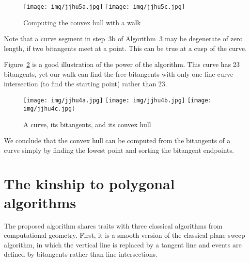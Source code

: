 \documentclass[11pt]{article}
\newif\ifTalk
\begin{document}
\begin{figure}[h]
\begin{center}
\texttt{[image: img/jjhu5a.jpg]} 
\texttt{[image: img/jjhu5c.jpg]}
\end{center}
\caption{Computing the convex hull with a walk}
\label{fig:algtrace}
\end{figure}

Note that a curve segment in step~3b of Algorithm~3 may be degenerate of zero length,
if two bitangents meet at a point.
This can be true at a cusp of the curve.

Figure~\ref{fig:convhullob3a} is a good illustration of the power of the 
algorithm.
This curve has 23 bitangents, yet our walk can find the free bitangents
with only one line-curve intersection (to find the starting point)
rather than 23.

\begin{figure}
\begin{center}
\texttt{[image: img/jjhu4a.jpg]}  
\texttt{[image: img/jjhu4b.jpg]}
\texttt{[image: img/jjhu4c.jpg]}
\end{center}
\caption{A curve, its bitangents, and its convex hull}
\label{fig:convhullob3a}
\end{figure}

We conclude that the convex hull can be computed from the bitangents of a curve
simply by finding the lowest point and sorting the bitangent endpoints.


\section{The kinship to polygonal algorithms}
\label{sec:analysis}

The proposed algorithm shares traits with three classical algorithms from computational geometry.
First, it is a smooth version of the classical plane sweep algorithm, 
in which the vertical line is replaced by a tangent line
and events are defined by bitangents rather than line intersections.

\ifTalk

\fi
\end{document}
